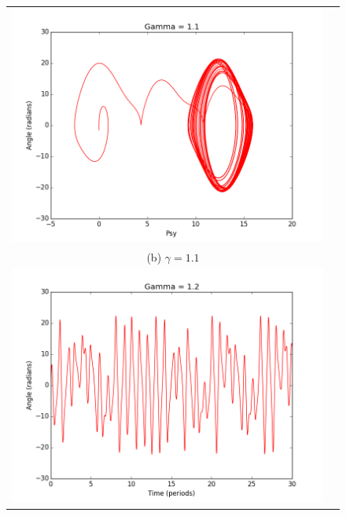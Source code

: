 \documentclass[11pt]{article}
\begin{document}
\begin{figure}[ht]
\begin{tabular}{cc}
\includegraphics[scale=.3]{g1psy.png}\\
\multicolumn{2}{c}{(b) $\gamma = 1.1 $} \\[6pt]

\includegraphics[scale=.3]{g2theta.png}&


\end{tabular}
\end{figure}
\end{document}
